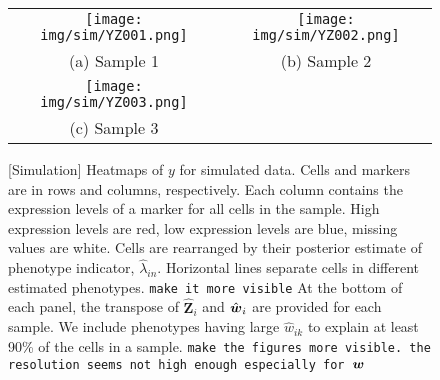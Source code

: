 \documentclass[12pt,]{article}
\def\beginmyfig{\begin{figure}[H]\center}
\def\endmyfig{\end{figure}}
\def\Z{\bm{Z}}
\newcommand{\true}{{\mbox{\tiny TR}}}
\newcommand{\bZ}{\mbox{\boldmath $Z$}}
\newcommand{\bw}{\mbox{\boldmath $w$}}
\def\beginmyfig{\begin{figure}[H]\center}
\def\endmyfig{\end{figure}}
\begin{document}
\begin{figure}[th!]
  \begin{center}
\begin{tabular}{cc}
\texttt{[image: img/sim/YZ001.png]}&
\texttt{[image: img/sim/YZ002.png]}\\
(a) Sample 1 & (b) Sample 2\\
\texttt{[image: img/sim/YZ003.png]}&\\
(c) Sample 3 & \\
  \end{tabular}
 \end{center}
 \vspace{-0.05in}
\caption{[Simulation]  Heatmaps of $y$ for simulated data. Cells and markers are in rows and columns, respectively. Each column contains the expression levels of a
marker for all cells in the sample. High expression levels are red, low expression levels are blue, missing values are white.   Cells are rearranged by their posterior estimate of phenotype indicator, $\hat{\lambda}_{in}$.   Horizontal lines separate cells in different estimated phenotypes.
%
{\tt make it more visible}
%
At the bottom of each panel, the transpose of $\hat{\Z}_i$ and $\hat{\bw}_i$ are provided for each sample. We include phenotypes having large $\hat{w}_{ik}$ to explain at least 90\% of the cells in a sample.
%
{\tt make the figures more visible.  the resolution seems not high enough
especially for $\bw$}
%
}
\label{fig:sim-post-Z}
\end{figure}





\end{document}
